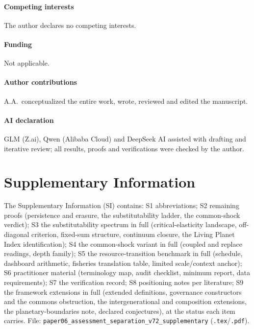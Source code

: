 \documentclass[preprint,11pt,authoryear]{elsarticle}
\theoremstyle{definition}
\theoremstyle{remark}
\begin{document}
\paragraph{Competing interests} The author declares no competing interests.
\paragraph{Funding} Not applicable.
\paragraph{Author contributions} A.A.\ conceptualized the entire work, wrote, reviewed and edited the manuscript.
\paragraph{AI declaration} GLM (Z.ai), Qwen (Alibaba Cloud) and DeepSeek AI assisted with drafting and iterative review; all results, proofs and verifications were checked by the author.

\section*{Supplementary Information}
The Supplementary Information (SI) contains: S1 abbreviations; S2 remaining proofs (persistence and erasure, the substitutability ladder, the common-shock verdict); S3 the substitutability spectrum in full (critical-elasticity landscape, off-diagonal criterion, fixed-sum structure, continuum closure, the Living Planet Index identification); S4 the common-shock variant in full (coupled and replace readings, depth family); S5 the resource-transition benchmark in full (schedule, dashboard arithmetic, fisheries translation table, limited scale/context anchor); S6 practitioner material (terminology map, audit checklist, minimum report, data requirements); S7 the verification record; S8 positioning notes per literature; S9 the framework extensions in full (extended definitions, governance constructors and the commons obstruction, the intergenerational and composition extensions, the planetary-boundaries note, declared conjectures), at the status each item carries. File: \texttt{paper06\_assessment\_separation\_v72\_supplementary} (\texttt{.tex}/\texttt{.pdf}).
\end{document}
